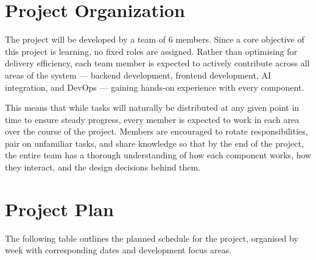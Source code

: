 \documentclass[12pt, a4paper]{article}
\begin{document}
\section{Project Organization}
The project will be developed by a team of 6 members. Since a core objective of this project is learning, no fixed roles are assigned. Rather than optimising for delivery efficiency, each team member is expected to actively contribute across all areas of the system --- backend development, frontend development, AI integration, and DevOps --- gaining hands-on experience with every component.

This means that while tasks will naturally be distributed at any given point in time to ensure steady progress, every member is expected to work in each area over the course of the project. Members are encouraged to rotate responsibilities, pair on unfamiliar tasks, and share knowledge so that by the end of the project, the entire team has a thorough understanding of how each component works, how they interact, and the design decisions behind them.

\section{Project Plan}

The following table outlines the planned schedule for the project, organised by week with corresponding dates and development focus areas.
\end{document}
